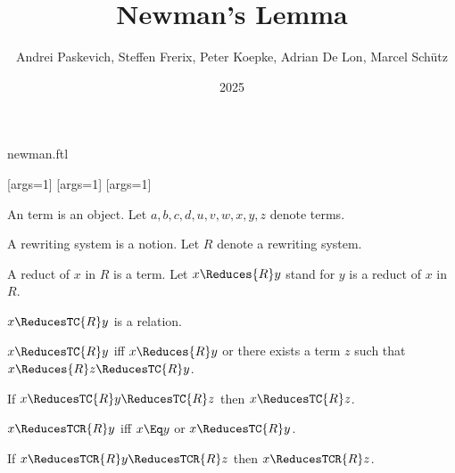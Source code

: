 \documentclass{stex}
\title{Newman's Lemma}
\author{Andrei Paskevich, Steffen Frerix, Peter Koepke, Adrian De Lon, Marcel Schütz}
\date{2025}
\begin{document}
\begin{smodule}{newman.ftl}
  

[args=1]{}
[args=1]{}
[args=1]{}


\maketitle

\begin{forthel}

  \begin{signature}[title=Term]
    An term is an object.
    Let $a,b,c,d,u,v,w,x,y,z$ denote terms.
  \end{signature}

  \begin{signature}[title=Rewriting System]
    A rewriting system is a notion.
    Let $R$ denote a rewriting system.
  \end{signature}

  \begin{signature}[title=Reduct]
    A reduct of $x$ in $R$ is a term.
    Let $x \Reduces{R} y$ stand for $y$ is a reduct of $x$ in $R$.
  \end{signature}

  \begin{signature}
    $x \ReducesTC{R} y$ is a relation.
  \end{signature}

  \begin{axiom}
    $x \ReducesTC{R} y$ iff $x \Reduces{R} y$ or there exists a term $z$ such that $x \Reduces{R} z \ReducesTC{R} y$.
  \end{axiom}

  \begin{axiom}
    If $x \ReducesTC{R} y \ReducesTC{R} z$ then $x \ReducesTC{R} z$.
  \end{axiom}

  \begin{definition}
    $x \ReducesTCR{R} y$ iff $x \Eq y$ or $x \ReducesTC{R} y$.
  \end{definition}

  \begin{lemma}
    If $x \ReducesTCR{R} y \ReducesTCR{R} z$ then $x \ReducesTCR{R} z$.
  \end{lemma}


\end{forthel}
\end{smodule}
\end{document}
